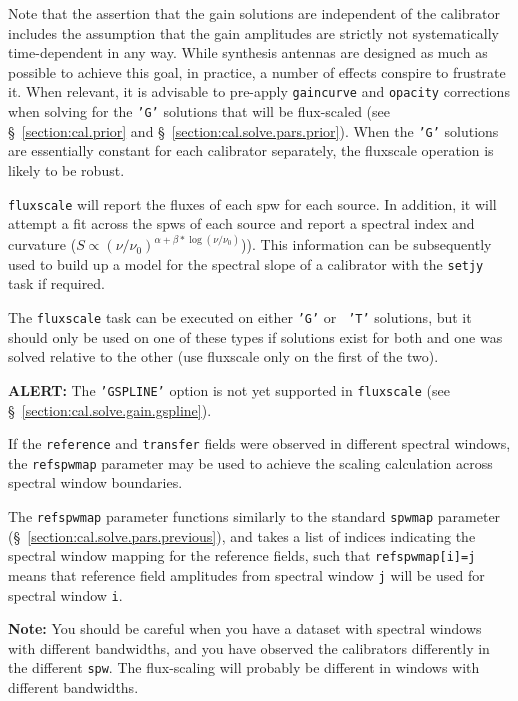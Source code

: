 Note that the assertion that the gain solutions are independent of the
calibrator includes the assumption that the gain amplitudes are
strictly not systematically time-dependent in any way.  While synthesis antennas
are designed as much as possible to achieve this goal, in practice, a
number of effects conspire to frustrate it.  When relevant, it is
advisable to pre-apply {\tt gaincurve} and {\tt opacity} 
corrections when solving
for the {\tt 'G'} solutions that will be flux-scaled (see 
\S~\ref{section:cal.prior} and \S~\ref{section:cal.solve.pars.prior}).
When the {\tt 'G'} solutions are essentially constant for each
calibrator separately, the fluxscale operation is likely to be robust.

{\tt fluxscale} will report the fluxes of each spw for each source. In
addition, it will attempt a fit across the spws of each source and
report a spectral index and curvature
($S\propto(\nu/\nu_0)^{\alpha+\beta*\log(\nu/\nu_0)}$)). This
information can be subsequently used to build up a model for the
spectral slope of a calibrator with the {\tt setjy} task if required. 

The {\tt fluxscale} task can be executed on either {\tt 'G'} or {\tt
'T'} solutions, but it should only be used on one of these types if
solutions exist for both and one was solved relative to the other (use
fluxscale only on the first of the two).  

{\bf ALERT:} The {\tt 'GSPLINE'} option is not yet supported in
{\tt fluxscale} (see \S~\ref{section:cal.solve.gain.gspline}).

If the {\tt reference} and {\tt transfer} fields were observed in different
spectral windows, the {\tt refspwmap} parameter may be used
to achieve the scaling calculation across spectral window boundaries.

The {\tt refspwmap} parameter functions similarly to the standard
{\tt spwmap} parameter (\S~\ref{section:cal.solve.pars.previous}),
and takes a list of indices
indicating the spectral window mapping for the reference fields,
such that {\tt refspwmap[i]=j} means that reference field amplitudes
from spectral window {\tt j} will be used for spectral window {\tt i}.

{\bf Note:} You should be careful when you have a dataset with
spectral windows with different bandwidths, and you
have observed the calibrators differently in the different {\tt spw}.
The flux-scaling will probably be different in windows with different
bandwidths.

